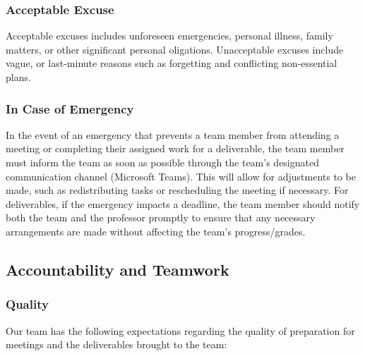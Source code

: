 \documentclass{article}
\begin{document}
\subsubsection*{Acceptable Excuse}

Acceptable excuses includes unforeseen emergencies, personal illness, family matters, or other significant personal oligations. Unacceptable excuses include vague, or last-minute reasons such as forgetting and conflicting non-essential plans.

\subsubsection*{In Case of Emergency}

In the event of an emergency that prevents a team member from attending a meeting or completing
their assigned work for a deliverable, the team member must inform the team as soon as possible
through the team's designated communication channel (Microsoft Teams). This will
allow for adjustments to be made, such as redistributing tasks or rescheduling the meeting if necessary.
For deliverables, if the emergency impacts a deadline, the team member should notify both the team and the professor promptly to ensure that any necessary
arrangements are made without affecting the team's progress/grades.

\subsection*{Accountability and Teamwork}

\subsubsection*{Quality} 
Our team has the following expectations regarding the quality of preparation for meetings and the deliverables brought to the team:
\end{document}
